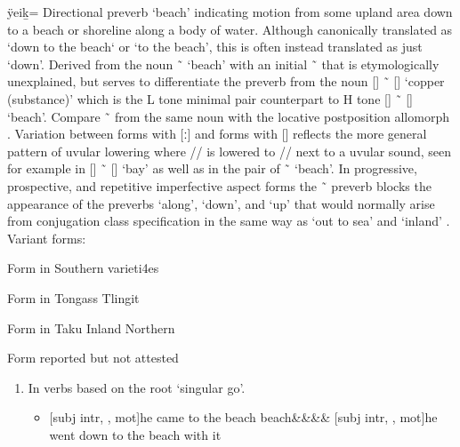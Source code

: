 \begin{morphdesc}[resume*=alphalist]
\item[ÿeiḵ=]\label{m:ÿeiḵ=}
	Directional preverb ‘beach’ indicating motion from some upland area down to a beach
		or shoreline along a body of water.
	Although canonically translated as ‘down to the beach‘ or ‘to the beach’, this is often
		instead translated as just ‘down’.
	Derived from the noun  \~\  ‘beach’
		with an initial  \~\  that is etymologically unexplained,
		but serves to differentiate the preverb from the noun
		 [] \~\  [] ‘copper (substance)’
		which is the L tone minimal pair counterpart
		to H tone  [] \~\  [] ‘beach’.
	Compare  \~\  from the same noun with the locative postposition
		allomorph .
	Variation between forms with  [ː] and forms with  []
		reflects the more general pattern of uvular lowering where  //
		is lowered to  // next to a uvular sound, seen for example in
		 [] \~\  [] ‘bay’ as well as in the
		pair of  \~\  ‘beach’.
	In progressive, prospective, and repetitive imperfective aspect forms the
		 \~\  preverb blocks the appearance of
		the preverbs  ‘along’,  ‘down’, and  ‘up’
		that would normally arise from conjugation class specification
		in the same way as  ‘out to sea’ and  ‘inland’
		\parencite[136]{leer:1991}.
	\newline
	Variant forms:
	\begin{allolist}
	\item[{\X{eeḵ=}}]
		Form in Southern varieti4es
	\item[{\X{eèḵ=}}]
		Form in Tongass Tlingit
	\item[\X{eiḵ=}]
		Form in Taku Inland Northern
	\item[\X{ÿeeḵ=}]
		Form reported but not attested
	\end{allolist}
	\begin{enumerate}
	\item	\label{item:ÿeiḵ=beach-gosg}
		In verbs based on the root  ‘singular go’.
		\begin{itemize}
		\item	{}[subj intr, , mot]{he came to the beach}
			\parencites[268.9]{swanton:1909}[03/185]{leer:1973}
					{beach&&&&\·}
			\versus {}[subj intr, , mot]{he went down to the beach with it}

\end{itemize}
\end{enumerate}
\end{morphdesc}
